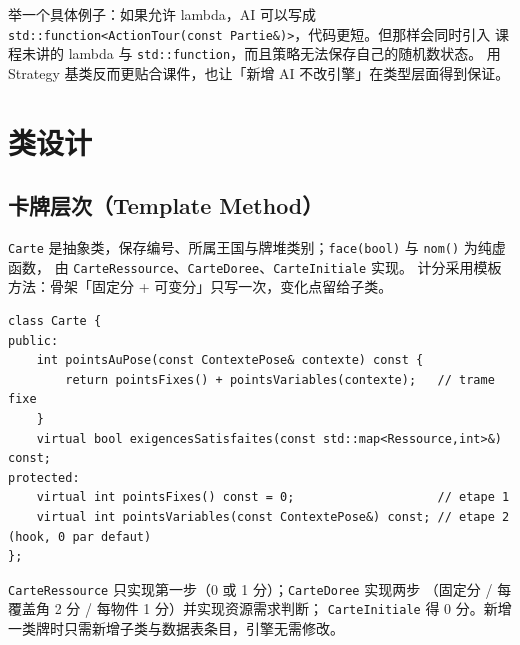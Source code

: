 \documentclass[11pt,a4paper]{ctexart}
\newcommand{\cl}[1]{\texttt{#1}}
\begin{document}
举一个具体例子：如果允许 lambda，AI 可以写成
\cl{std::function<ActionTour(const Partie\&)>}，代码更短。但那样会同时引入
课程未讲的 lambda 与 \cl{std::function}，而且策略无法保存自己的随机数状态。
用 Strategy 基类反而更贴合课件，也让「新增 AI 不改引擎」在类型层面得到保证。

\section{类设计}

\subsection{卡牌层次（Template Method）}
\cl{Carte} 是抽象类，保存编号、所属王国与牌堆类别；\cl{face(bool)} 与 \cl{nom()} 为纯虚函数，
由 \cl{CarteRessource}、\cl{CarteDoree}、\cl{CarteInitiale} 实现。
计分采用模板方法：骨架「固定分 + 可变分」只写一次，变化点留给子类。

\begin{lstlisting}
class Carte {
public:
    int pointsAuPose(const ContextePose& contexte) const {
        return pointsFixes() + pointsVariables(contexte);   // trame fixe
    }
    virtual bool exigencesSatisfaites(const std::map<Ressource,int>&) const;
protected:
    virtual int pointsFixes() const = 0;                    // etape 1
    virtual int pointsVariables(const ContextePose&) const; // etape 2 (hook, 0 par defaut)
};
\end{lstlisting}

\cl{CarteRessource} 只实现第一步（0 或 1 分）；\cl{CarteDoree} 实现两步
（固定分 / 每覆盖角 2 分 / 每物件 1 分）并实现资源需求判断；
\cl{CarteInitiale} 得 0 分。新增一类牌时只需新增子类与数据表条目，引擎无需修改。
\end{document}
